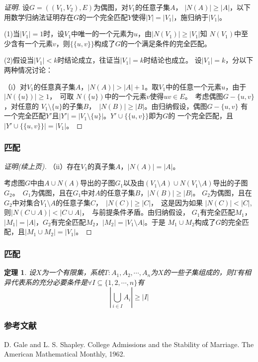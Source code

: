 \documentclass{beamer}
\newtheorem{Thm}{定理}[section]
\theoremstyle{definition}
\theoremstyle{example}
\begin{document}
\begin{CJK}{UTF8}{gbsn}
\begin{frame}
\begin{proof}[证明]
设$G=((V_1,V_2),E)$为偶图，对$V_1$的任意子集$A$， $|N(A)| \geq |A|$，以下用数学归纳法证明存在$G$的一个完全匹配$Y$使得$|Y| = |V_1|$，施归纳于$|V_1|$。

(1)当$|V_1|=1$时，设$V_1$中唯一的一个元素为$u$，由$|N(V_1)| \geq |V_1|$知
$N(V_1)$中至少含有一个元素$v$，则$\{\{u,v\}\}$构成了$G$的一个满足条件的完全匹配。

(2)假设当$|V_1|<k$时结论成立，往证当$|V_1|=k$时结论也成立。
设$|V_1|=k$，分以下两种情况讨论：

（i）对$V_1$的任意真子集$A$，$|N(A)| > |A| + 1$。取$V_1$中的任意一个元素$u$，由于$|N(\{u\})| \geq 1$，　可取
$N(\{u\})$中的一个元素$v$使得$uv \in E$。　考虑偶图$G-\{u,v\}$，对任意的
$V_1\setminus \{u\}$的子集$B$，　$|N(B)| \geq |B|$。由归纳假设，偶图$G-\{u,v\}$
有一个完全匹配$Y'$且$|Y'| = |V_1\setminus \{u\}|$。$Y' \cup \{\{u,v\}\}$即为$G$的
一个完全匹配，且$|Y' \cup \{\{u,v\}\}| = |V_1|$。
  \end{proof}
\end{frame}
\begin{frame}
  \frametitle{匹配}
  \begin{proof}[证明(续上页)]
\justifying\let\raggedright\justifying
（ii）存在$V_1$的真子集$A$，$|N(A)| = |A|$。

考虑图$G$中由$A \cup N(A)$导出的子图$G_1$以及由$(V_1\setminus A) \cup
N(V_1\setminus A)$导出的子图$G_2$。　$G_1$为偶图，且在$G_1$中对$A$的任意子集$B$，$|N(B)| \geq |B|$。
$G_2$为偶图，且在$G_2$中对集合$V_1\setminus A$的任意子集$C$，　$|N(C)| \geq |C|$，　这是因为如果
$|N(C)| < |C|$, 则$|N(C \cup A)| < |C \cup A|$，　与前提条件矛盾。由归纳假设，
$G_1$有完全匹配$M_1$，$|M_1|=|A|$，$G_2$有完全匹配$M_2$，$|M_2|=|V_1\setminus A|$。于是
$M_1\cup M_2$构成了$G$的完全匹配，且$|M_1\cup M_2| = |V_1|$。

  \end{proof}
\end{frame}

\begin{frame}
  \frametitle{匹配}
    \begin{Thm}
    设$X$为一个有限集，系统$T:A_1,A_2,\cdots,A_n$为$X$的一些子集组成的，则$T$有相异代表系的充分必要条件是$\forall I \subseteq \{1,2,\cdots, n\}$有
    \[|\bigcup_{i\in I}A_i|\geq |I|\]
  \end{Thm}
\end{frame}
\begin{frame}
  
  \frametitle{参考文献}

    \begin{thebibliography}{99}
  D. Gale and L. S. Shapley.
\newblock College Admissions and the Stability of Marriage.
\newblock The American Mathematical Monthly,  1962.
  \end{thebibliography}

\end{frame}


\end{CJK}


%
%
\end{document}
